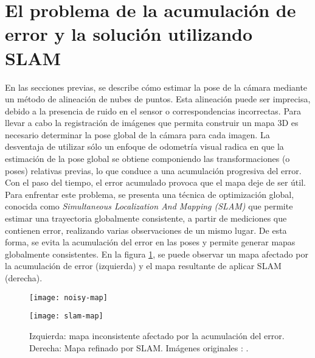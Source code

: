 \section{El problema de la acumulación de error y la solución utilizando SLAM}
\label{sec:acumulacion-del-error-slam}

En las secciones previas, se describe cómo estimar la pose de la cámara mediante un método de alineación de nubes de puntos. Esta alineación puede ser imprecisa, debido a la presencia de ruido en el sensor o correspondencias incorrectas. Para llevar a cabo la registración de imágenes que permita construir un mapa 3D es necesario determinar la pose global de la cámara para cada imagen. La desventaja de utilizar sólo un enfoque de odometría visual radica en que la estimación de la pose global se obtiene componiendo las transformaciones (o poses) relativas previas, lo que conduce a una acumulación progresiva del error. Con el paso del tiempo, el error acumulado provoca que el mapa deje de ser útil. \\
Para enfrentar este problema, se presenta una técnica de optimización global, conocida como \textit{Simultaneous Localization And Mapping (SLAM)} que permite estimar una trayectoria globalmente consistente, a partir de mediciones que contienen error, realizando varias observaciones de un mismo lugar. De esta forma, se evita la acumulación del error en las poses y permite generar mapas globalmente consistentes. En la figura \ref{fig:maps-noisy-slam}, se puede observar un mapa afectado por la acumulación de error (izquierda) y el mapa resultante de aplicar SLAM (derecha). \\

\begin{figure}[ht]
\centering
\begin{minipage}[h]{.45\textwidth}
\begin{center}
\texttt{[image: noisy-map]}
\end{center}
\end{minipage}
\hfill
\begin{minipage}[h]{.45\textwidth}
\begin{center}
\texttt{[image: slam-map]}
\end{center}
\end{minipage}
\hfill
\caption[Efecto de la acumulación del error y optimización con SLAM sobre un mapa]
{Izquierda: mapa inconsistente afectado por la acumulación del error. Derecha: Mapa refinado por SLAM. Imágenes originales : \cite{GrisettiKSB10}.}
\label{fig:maps-noisy-slam}
\end{figure}

